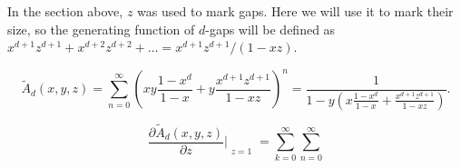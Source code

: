 \documentclass{article}
\begin{document}
In the section above, $z$ was used to mark gaps. Here we will use it to
mark their size, so the generating function of $d$-gaps will be defined as
$x^{d+1}z^{d+1} + x^{d+2}z^{d+2} + \ldots = x^{d+1}z^{d+1}/(1-xz)$.

\begin{equation*}
\tilde{A}_d(x,y,z) = \sum_{n=0}^\infty \left(xy\frac{1-x^d}{1-x} +
y\frac{x^{d+1}z^{d+1}}{1-xz}\right)^n =
\frac{1}{1-y \left(x\frac{1-x^d}{1-x} +
\frac{x^{d+1}z^{d+1}}{1-xz} \right)}.
\end{equation*}

\begin{equation*}
\frac{\partial\tilde{A}_d(x,y,z)}{\partial z}\Bigr|_{\substack{\\z=1}} =
\sum_{k=0}^\infty\sum_{n=0}^\infty
\end{equation*}






\end{document}
